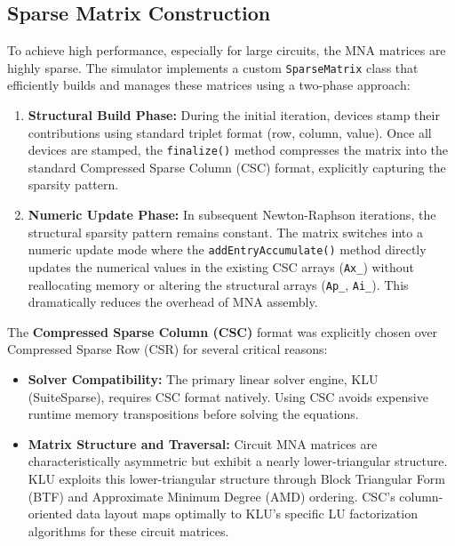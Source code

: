 \subsection{Sparse Matrix Construction}
To achieve high performance, especially for large circuits, the MNA matrices are highly sparse. The simulator implements a custom \texttt{SparseMatrix} class that efficiently builds and manages these matrices using a two-phase approach:
\begin{enumerate}
    \item \textbf{Structural Build Phase:} During the initial iteration, devices stamp their contributions using standard triplet format (row, column, value). Once all devices are stamped, the \texttt{finalize()} method compresses the matrix into the standard Compressed Sparse Column (CSC) format, explicitly capturing the sparsity pattern.
    \item \textbf{Numeric Update Phase:} In subsequent Newton-Raphson iterations, the structural sparsity pattern remains constant. The matrix switches into a numeric update mode where the \texttt{addEntryAccumulate()} method directly updates the numerical values in the existing CSC arrays (\texttt{Ax\_}) without reallocating memory or altering the structural arrays (\texttt{Ap\_}, \texttt{Ai\_}). This dramatically reduces the overhead of MNA assembly.
\end{enumerate}

The \textbf{Compressed Sparse Column (CSC)} format was explicitly chosen over Compressed Sparse Row (CSR) for several critical reasons:
\begin{itemize}
    \item \textbf{Solver Compatibility:} The primary linear solver engine, KLU (SuiteSparse), requires CSC format natively. Using CSC avoids expensive runtime memory transpositions before solving the equations.
    \item \textbf{Matrix Structure and Traversal:} Circuit MNA matrices are characteristically asymmetric but exhibit a nearly lower-triangular structure. KLU exploits this lower-triangular structure through Block Triangular Form (BTF) and Approximate Minimum Degree (AMD) ordering. CSC's column-oriented data layout maps optimally to KLU's specific LU factorization algorithms for these circuit matrices.
\end{itemize}

